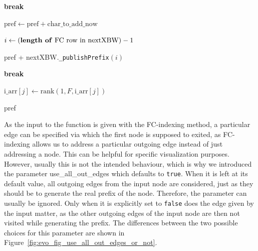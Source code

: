 \documentclass[a4paper,12pt,twoside,BCOR=10mm]{scrbook}
\begin{document}
\begin{algorithm}
\begin{algorithmic}[1]
		\State \textbf{break}

	\Else

		\State $ \textrm{pref} \gets \textrm{pref} + \textrm{char\_to\_add\_now} $


			\State $ i \gets (\textrm{\textbf{length of} FC row in nextXBW}) - 1 $

			\State \Return pref + nextXBW.\texttt{\_publishPrefix}$( i )$
		\EndIf
	\EndIf

		\State \textbf{break}
	\EndIf

		\State $ \textrm{i\_arr}[ j ] \gets \textrm{rank}(1, F, \textrm{i\_arr}[ j ]) $
	\EndFor
\EndFor

\State \Return pref

\end{algorithmic}
\end{algorithm}
As the input to the function is given with the FC-indexing method, a particular edge can be specified
via which the first node is supposed to exited, as FC-indexing allows us to address a particular 
outgoing edge instead of just addressing a node. This can be helpful for specific visualization purposes.
However, usually this is not the intended behaviour, which is why we introduced the parameter
use\_all\_out\_edges which defaults to \texttt{true}.
When it is left at its default value, all outgoing edges from the input node are considered,
just as they should be to generate the real prefix of the node. Therefore, the parameter can usually be ignored.
Only when it is explicitly set to \texttt{false} does the edge given by the input matter,
as the other outgoing edges of the input node are then not visited while generating the prefix.
The differences between the two possible choices for this parameter
are shown in Figure~\ref{fig:evo_fig_use_all_out_edges_or_not}. \\
\end{document}
